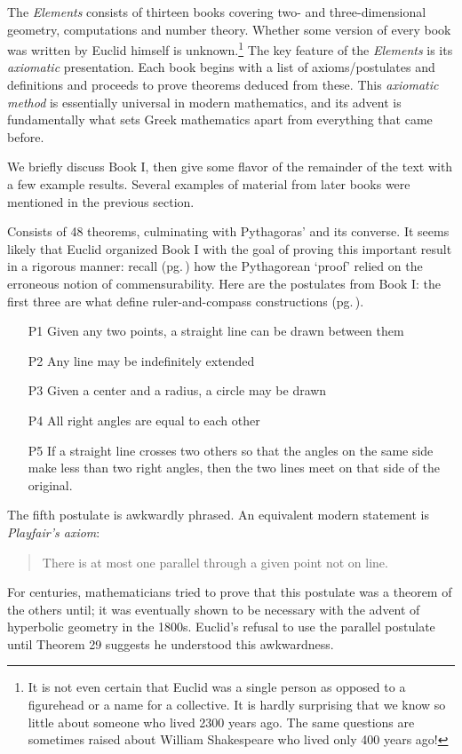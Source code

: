 
The \emph{Elements} consists of thirteen books covering two- and three-dimensional geometry, computations and number theory. Whether some version of every book was written by Euclid himself is unknown.\footnote{It is not even certain that Euclid was a single person as opposed to a figurehead or a name for a collective. It is hardly surprising that we know so little about someone who lived 2300 years ago. The same questions are sometimes raised about William Shakespeare who lived only 400 years ago!} The key feature of the \emph{Elements} is its \emph{axiomatic} presentation. Each book begins with a list of axioms/postulates and definitions and proceeds to prove theorems deduced from these. This \emph{axiomatic method} is essentially universal in modern mathematics, and its advent is fundamentally what sets Greek mathematics apart from everything that came before.\smallbreak

We briefly discuss Book I, then give some flavor of the remainder of the text with a few example results. Several examples of material from later books were mentioned in the previous section.



Consists of 48 theorems, culminating with Pythagoras' and its converse. It seems likely that Euclid organized Book I with the goal of proving this important result in a rigorous manner: recall (pg.\,\pageref{pthagorig}) how the Pythagorean `proof' relied on the erroneous notion of commensurability. Here are the postulates from Book I: the first three are what define ruler-and-compass constructions (pg.\,\pageref{pg:construction}).

\begin{itemize}\itemsep0pt
  \item[P1] Given any two points, a straight line can be drawn between them
  \item[P2] Any line may be indefinitely extended
  \item[P3] Given a center and a radius, a circle may be drawn
  \item[P4] All right angles are equal to each other
  \item[P5] If a straight line crosses two others so that the angles on the same side make less than two right angles, then the two lines meet on that side of the original.
\end{itemize}

The fifth postulate is awkwardly phrased. An equivalent modern statement is \emph{Playfair's axiom}:
\begin{quote}
There is at most one parallel through a given point not on line.
\end{quote}
For centuries, mathematicians tried to prove that this postulate was a theorem of the others until; it was eventually shown to be necessary with the advent of hyperbolic geometry in the 1800s. Euclid's refusal to use the parallel postulate until Theorem 29 suggests he understood this awkwardness.\smallbreak


